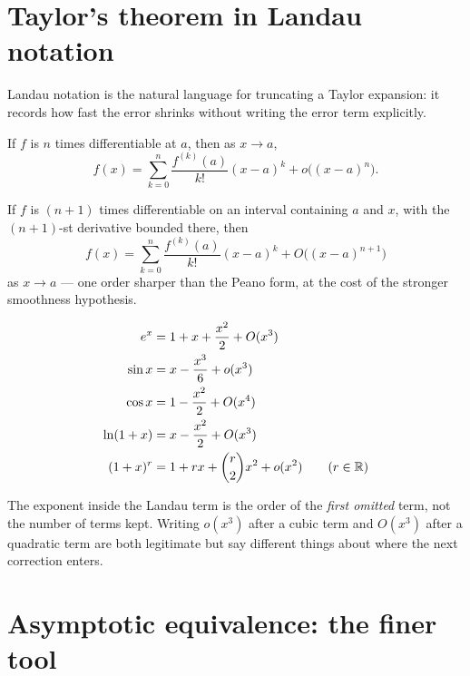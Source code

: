 \documentclass{essay}
\begin{document}
\section{Taylor's theorem in Landau notation}

Landau notation is the natural language for truncating a Taylor expansion: it records how fast the error shrinks without writing the error term explicitly.

\begin{theorem}
If $f$ is $n$ times differentiable at $a$, then as $x\to a$,
\[
  f(x) = \sum_{k=0}^{n} \frac{f^{(k)}(a)}{k!}(x-a)^k + o\big((x-a)^n\big).
\]
\end{theorem}

\begin{theorem}
If $f$ is $(n+1)$ times differentiable on an interval containing $a$ and $x$, with the $(n+1)$-st derivative bounded there, then
\[
  f(x) = \sum_{k=0}^{n} \frac{f^{(k)}(a)}{k!}(x-a)^k + O\big((x-a)^{n+1}\big)
\]
as $x\to a$ --- one order sharper than the Peano form, at the cost of the stronger smoothness hypothesis.
\end{theorem}

\begin{example}
\begin{align*}
  e^x &= 1 + x + \frac{x^2}{2} + O(x^3) \\
  \sin x &= x - \frac{x^3}{6} + o(x^3) \\
  \cos x &= 1 - \frac{x^2}{2} + O(x^4) \\
  \ln(1+x) &= x - \frac{x^2}{2} + O(x^3) \\
  (1+x)^r &= 1 + rx + \binom{r}{2}x^2 + o(x^2) \qquad (r\in\mathbb{R})
\end{align*}
\end{example}

\begin{remark}
The exponent inside the Landau term is the order of the \emph{first omitted} term, not the number of terms kept. Writing $o(x^3)$ after a cubic term and $O(x^3)$ after a quadratic term are both legitimate but say different things about where the next correction enters.
\end{remark}

\section{Asymptotic equivalence: the finer tool}
\end{document}
